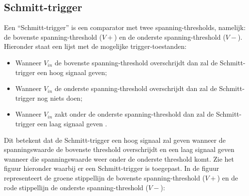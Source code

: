 \documentclass[12pt]{article}
\begin{document}
\subsection{Schmitt-trigger}
Een ``Schmitt-trigger'' is een comparator met twee spanning-thresholds, namelijk: de bovenste spanning-threshold ($V+$) en de onderste spanning-threshold ($V-$). 
Hieronder staat een lijst met de mogelijke trigger-toestanden:
\begin{itemize}
    \item Wanneer $V_{in}$ de bovenste spanning-threshold overschrijdt dan zal de Schmitt-trigger een hoog signaal geven;
    \item Wanneer $V_{in}$ de onderste spanning-threshold overschrijdt dan zal de Schmitt-trigger nog niets doen;
    \item Wanneer $V_{in}$ zakt onder de onderste spanning-threshold dan zal de Schmitt-trigger een laag signaal geven \cite{schmit}. 
\end{itemize}
Dit betekent dat de Schmitt-trigger een hoog signaal zal geven wanneer de spanningswaarde de bovenste threshold overschrijdt en een laag signaal geven wanneer die spanningswaarde weer onder de onderste threshold komt. 
Zie het figuur hieronder waarbij er een Schmitt-trigger is toegepast. In de figuur representeert de groene stippellijn de bovenste spanning-threshold ($V+$) en de rode stippellijn de onderste spanning-threshold ($V-$):
\end{document}
